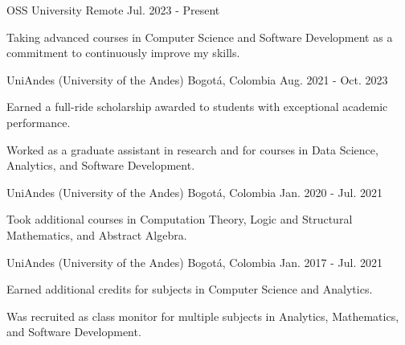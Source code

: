 

\begin{cventries}

	{OSS University} %
	{Remote} %
	{Jul. 2023 {-} Present} %
	{
		\begin{cvitems} %
			\item {Taking advanced courses in Computer Science and Software Development as a commitment to continuously improve my skills.}
		\end{cvitems}
	}

	{UniAndes (University of the Andes)} %
	{Bogotá, Colombia} %
	{Aug. 2021 {-} Oct. 2023} %
	{
		\begin{cvitems} %
			\item {Earned a full-ride scholarship awarded to students with exceptional academic performance.}
			\item {Worked as a graduate assistant in research and for courses in Data Science, Analytics, and Software Development.}
		\end{cvitems}
	}

	{UniAndes (University of the Andes)} %
	{Bogotá, Colombia} %
	{Jan. 2020 {-} Jul. 2021} %
	{
		\begin{cvitems} %
			\item {Took additional courses in Computation Theory, Logic and Structural Mathematics, and Abstract Algebra.}
		\end{cvitems}
	}

	{UniAndes (University of the Andes)} %
	{Bogotá, Colombia} %
	{Jan. 2017 {-} Jul. 2021} %
	{
		\begin{cvitems} %
			\item {Earned additional credits for subjects in Computer Science and Analytics.}
			\item {Was recruited as class monitor for multiple subjects in Analytics, Mathematics, and Software Development.}
		\end{cvitems}
	}

\end{cventries}
